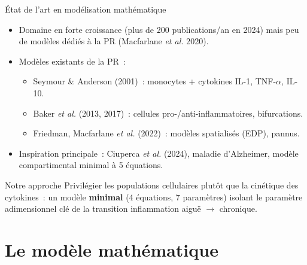 \documentclass[aspectratio=169,12pt]{beamer}
\begin{document}
\begin{frame}{État de l'art en modélisation mathématique}
{\footnotesize
\begin{itemize}\itemsep1pt
\item Domaine en forte croissance (plus de 200 publications/an en 2024) mais peu de modèles dédiés à la PR (Macfarlane \textit{et al.} 2020).
\item Modèles existants de la PR~:
  \begin{itemize}\itemsep0pt
  \item Seymour \& Anderson (2001)~: monocytes + cytokines IL-1, TNF-$\alpha$, IL-10.
  \item Baker \textit{et al.} (2013, 2017)~: cellules pro-/anti-inflammatoires, bifurcations.
  \item Friedman, Macfarlane \textit{et al.} (2022)~: modèles spatialisés (EDP), pannus.
  \end{itemize}
\item Inspiration principale~: Ciuperca \textit{et al.} (2024), maladie d'Alzheimer, modèle compartimental minimal à 5 équations.
\end{itemize}}
\vspace{1pt}
\begin{alertblock}{Notre approche}
\footnotesize Privilégier les \alert{populations cellulaires} plutôt que la cinétique des cytokines~: un modèle \textbf{minimal} (4 équations, 7 paramètres) isolant le paramètre adimensionnel clé de la transition inflammation aiguë $\to$ chronique.
\end{alertblock}
\end{frame}

\section{Le modèle mathématique}
\end{document}
